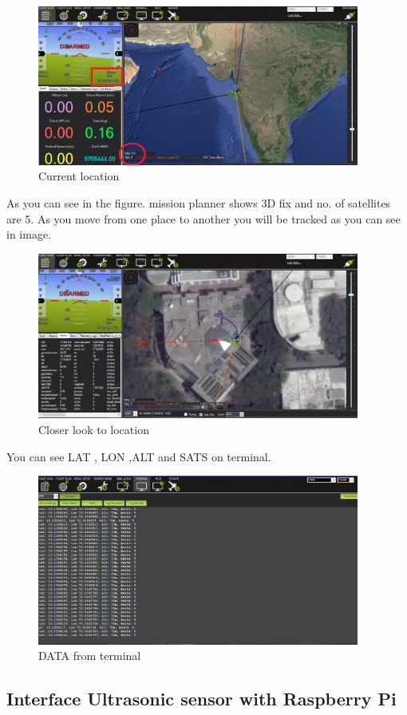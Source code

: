 \documentclass[a4paper,12pt,oneside]{book}
\begin{document}
		\begin{figure}[H]
		\centering
		\includegraphics[width = 400px]{map1}
		\caption{Current location}
		\end{figure}
		As you can see in the figure. mission planner shows 3D fix and no. of satellites are 5.
		As you move from one place to another you will be tracked as you can see in image.
			\begin{figure}[H]
			    \centering
				\includegraphics[width = 400px]{map2}
				\caption{Closer look to location}
			\end{figure}
	You can see  LAT , LON ,ALT and SATS on terminal.
		\begin{figure}[H]
		    \centering
			\includegraphics[width = 400px]{map3}
			\caption{DATA from terminal}
		\end{figure}

\subsection{Interface Ultrasonic sensor with Raspberry Pi}
\end{document}
